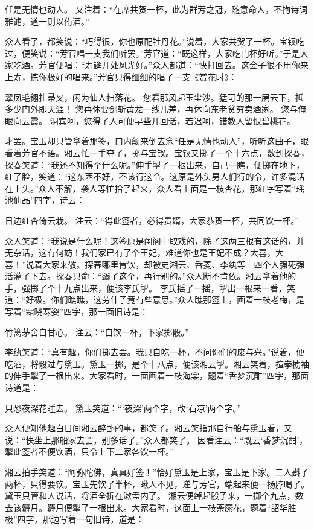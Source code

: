 \documentclass[12pt,oneside]{book}
\begin{document}
任是无情也动人。
又注着：“在席共贺一杯，此为群芳之冠，随意命人，不拘诗词雅谑，道一则以侑酒。”

众人看了，都笑说：“巧得很，你也原配牡丹花。”说着，大家共贺了一杯。宝钗吃过，便笑说：“芳官唱一支我们听罢。”芳官道：“既这样，大家吃门杯好听。”于是大家吃酒。芳官便唱：“寿筵开处风光好。”众人都道：“快打回去。这会子很不用你来上寿，拣你极好的唱来。”芳官只得细细的唱了一支《赏花时》：

翠凤毛翎扎帚叉，闲为仙人扫落花。
您看那风起玉尘沙。猛可的那一层云下，抵多少门外即天涯！
您再休要剑斩黄龙一线儿差，再休向东老贫穷卖酒家。
您与俺眼向云霞。
洞宾呵，您得了人可便早些儿回话，若迟呵，错教人留恨碧桃花。

才罢。宝玉却只管拿着那签，口内颠来倒去念“任是无情也动人”，听听这曲子，眼看着芳官不语。湘云忙一手夺了，掷与宝钗。宝钗又掷了一个十六点，数到探春，探春笑道：“我还不知得个什么呢。”伸手掣了一根出来，自己一瞧，便掷在地下，红了脸，笑道：“这东西不好，不该行这令。这原是外头男人们行的令，许多混话在上头。”众人不解，袭人等忙拾了起来，众人看上面是一枝杏花，那红字写着“瑶池仙品”四字，诗云：

日边红杏倚云栽。
注云︰“得此签者，必得贵婿，大家恭贺一杯，共同饮一杯。”

众人笑道：“我说是什么呢！这签原是闺阁中取戏的，除了这两三根有这话的，并无杂话，这有何妨！我们家已有了个王妃，难道你也是王妃不成？大喜，大喜！”说着大家来敬。探春哪里肯饮，却被史湘云、香菱、李纨等三四个人强死强活灌了下去。探春只命：“蠲了这个，再行别的。”众人断不肯依。湘云拿着他的手，强掷了个十九点出来，便该李氏掣。
李氏摇了一摇，掣出一根来一看，笑道：“好极。你们瞧瞧，这劳什子竟有些意思。”众人瞧那签上，画着一枝老梅，是写着“霜晓寒姿”四字，那一面旧诗是：

竹篱茅舍自甘心。
注云：“自饮一杯，下家掷骰。”

李纨笑道：“真有趣，你们掷去罢。我只自吃一杯，不问你们的废与兴。”说着，便吃酒，将骰过与黛玉。黛玉一掷，是个十八点，便该湘云掣。湘云笑着，揎拳掳袖的伸手掣了一根出来。大家看时，一面画着一枝海棠，题着“香梦沉酣”四字，那面诗道是：

只恐夜深花睡去。
黛玉笑道：“‘夜深’两个字，改‘石凉’两个字。”

众人便知他趣白日间湘云醉卧的事，都笑了。湘云笑指那自行船与黛玉看，又说：“快坐上那船家去罢，别多话了。”众人都笑了。
因看注云：“既云‘香梦沉酣’，掣此签者不便饮酒，只令上下二家各饮一杯。”

湘云拍手笑道：“阿弥陀佛，真真好签！”恰好黛玉是上家，宝玉是下家。二人斟了两杯，只得要饮。宝玉先饮了半杯，瞅人不见，递与芳官，端起来便一扬脖喝了。黛玉只管和人说话，将酒全折在漱盂内了。
湘云便绰起骰子来，一掷个九点，数去该麝月。麝月便掣了一根出来。大家看时，这面上一枝荼縻花，题着“韶华胜极”四字，那边写着一句旧诗，道是：
\end{document}
